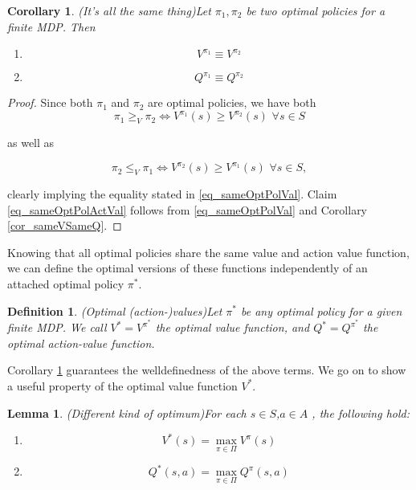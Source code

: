 \documentclass[11pt]{article} %
\newtheorem{lem}{Lemma}
\newtheorem{cor}{Corollary}
\newtheorem{defn}{Definition}
\begin{document}
\begin{cor}{(It's all the same thing)}\label{cor_sameOptPol}
	Let $\pi_1, \pi_2$ be two optimal policies for a finite MDP. Then
	\begin{enumerate}
		\item \begin{equation}\label{eq_sameOptPolVal} V^{\pi_1} \equiv V^{\pi_2} \end{equation}
		\item \begin{equation}\label{eq_sameOptPolActVal} Q^{\pi_1} \equiv Q^{\pi_2} \end{equation}
	\end{enumerate}
\end{cor}

\begin{proof}
	Since both $\pi_1$ and $\pi_2$ are optimal policies, we have both
	\begin{equation}
		\pi_1 \ge_V \pi_2 \Leftrightarrow V^{\pi_1}(s) \ge V^{\pi_2}(s) \, \, \forall s \in S
	\end{equation}

	as well as

	\begin{equation}
		\pi_2 \le_V \pi_1 \Leftrightarrow V^{\pi_2}(s) \ge V^{\pi_1}(s) \, \, \forall s \in S,
	\end{equation}

	clearly implying the equality stated in \ref{eq_sameOptPolVal}. Claim \ref{eq_sameOptPolActVal} follows from \ref{eq_sameOptPolVal} and Corollary \ref{cor_sameVSameQ}.

\end{proof}

Knowing that all optimal policies share the same value and action value function, we can define the optimal versions of these functions independently of an attached optimal policy $\pi^*$.

\begin{defn}{(Optimal (action-)values)}\label{def_uniqueOptActVal}
	Let $\pi^*$ be any optimal policy for a given finite MDP. We call $V^* = V^{\pi^*}$ the optimal value function, and $Q^* = Q^{\pi^*}$ the optimal action-value function.
\end{defn}

Corollary \ref{cor_sameOptPol} guarantees the welldefinedness of the above terms. We go on to show a useful property of the optimal value function $V^*$.

\begin{lem}{(Different kind of optimum)}\label{cor_optValMaxS}
	For each $s \in S$,$a \in A$ , the following hold:
	\begin{enumerate}
		\item \begin{equation}\label{eq_optValMax} V^*(s) = \max_{\pi \in \Pi} V^{\pi}(s) \end{equation}
		\item \begin{equation}\label{eq_optActValMax} Q^*(s,a) = \max_{\pi \in \Pi} Q^{\pi}(s,a) \end{equation}
	\end{enumerate}
\end{lem}
\end{document}
